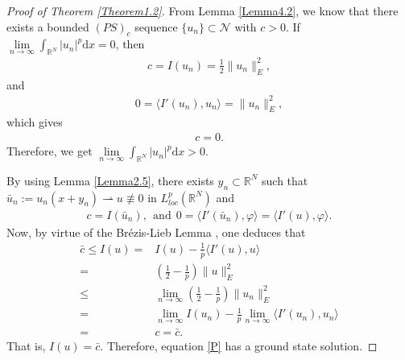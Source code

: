 \documentclass[12pt,a4paper,reqno]{amsart}
\numberwithin{equation}{section}
\begin{document}
\begin{proof}[Proof of Theorem \ref{Theorem1.2}]
From Lemma \ref{Lemma4.2}, we know that there exists a bounded $(PS)_{c}$ sequence $\{u_{n}\}\subset \mathcal{N}$ with $c>0$.
If $\lim\limits_{n\to\infty}\int_{\mathbb{R}^{N}}|u_{n}|^{p}\mathrm{d}x=0$, then
\begin{equation*}
\begin{aligned}
c=I(u_{n})
=\frac{1}{2}\|u_{n}\|_{E}^{2},
\end{aligned}
\end{equation*}
and
\begin{equation*}
\begin{aligned}
0=\langle I'(u_{n}),u_{n}\rangle
=\|u_{n}\|_{E}^{2},
\end{aligned}
\end{equation*}
which gives
\begin{equation*}
\begin{aligned}
c=0.
\end{aligned}
\end{equation*}
Therefore, we get $\lim\limits_{n\to\infty}\int_{\mathbb{R}^{N}}|u_{n}|^{p}\mathrm{d}x>0$.


By using Lemma \ref{Lemma2.5}, there exists $y_{n}\subset \mathbb{R}^{N}$ such that  $\bar{u}_{n}:=u_{n}(x+y_{n})\rightharpoonup u\not \equiv0$ in $L^{p}_{loc}(\mathbb{R}^{N})$ and
\begin{equation*}
\begin{aligned}
c
=I(\bar{u}_{n}),~~\mathrm{and}~~0
=\langle I'(\bar{u}_{n}),\varphi\rangle
=\langle I'(u),\varphi\rangle.
\end{aligned}
\end{equation*}
Now, by virtue of the Brézis-Lieb Lemma \cite{Brezis-Lieb1983PAMS}, one deduces that
\begin{equation*}
\begin{aligned}
\bar{c}
\leqslant I(u)
=&
I(u)-\frac{1}{p}\langle I'(u),u\rangle\\
=&
\left(\frac{1}{2}-\frac{1}{p}\right)
\|u\|_{E}^{2}\\
\leqslant&
\lim\limits_{n\to\infty}
\left(\frac{1}{2}-\frac{1}{p}\right)
\|u_{n}\|_{E}^{2}\\
=&
\lim\limits_{n\to\infty}
I(u_{n})
-\frac{1}{p}
\lim\limits_{n\to\infty}
\langle I'(u_{n}),u_{n}\rangle\\
=&c
=\bar{c}.
\end{aligned}
\end{equation*}
That is,
$I(u)=\bar{c}$.
Therefore,
equation \eqref{P} has a ground state solution.
\end{proof}
\end{document}
